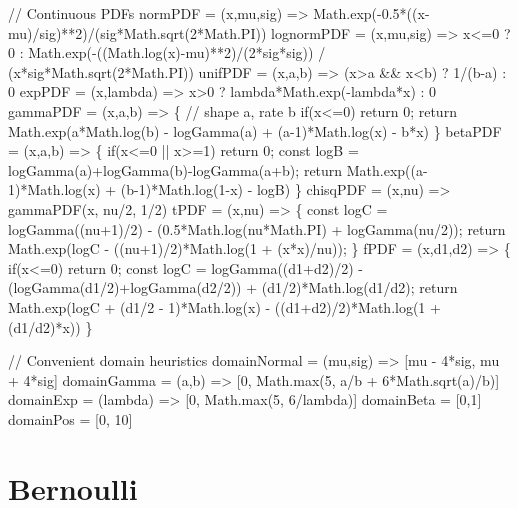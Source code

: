 \documentclass[
  letterpaper,
  DIV=11,
  numbers=noendperiod]{scrreprt}
\newenvironment{Shaded}{\begin{snugshade}}{\end{snugshade}}
\newcommand{\NormalTok}[1]{\textcolor[rgb]{0.00,0.23,0.31}{#1}}
\theoremstyle{definition}
\theoremstyle{plain}
\theoremstyle{definition}
\theoremstyle{remark}
\begin{document}
\begin{Shaded}
\begin{Highlighting}[]
\NormalTok{// Continuous PDFs}
\NormalTok{normPDF = (x,mu,sig) =\textgreater{} Math.exp({-}0.5*((x{-}mu)/sig)**2)/(sig*Math.sqrt(2*Math.PI))}
\NormalTok{lognormPDF = (x,mu,sig) =\textgreater{} x\textless{}=0 ? 0 : Math.exp({-}((Math.log(x){-}mu)**2)/(2*sig*sig)) / (x*sig*Math.sqrt(2*Math.PI))}
\NormalTok{unifPDF = (x,a,b) =\textgreater{} (x\textgreater{}a \&\& x\textless{}b) ? 1/(b{-}a) : 0}
\NormalTok{expPDF = (x,lambda) =\textgreater{} x\textgreater{}0 ? lambda*Math.exp({-}lambda*x) : 0}
\NormalTok{gammaPDF = (x,a,b) =\textgreater{} \{ // shape a, rate b}
\NormalTok{  if(x\textless{}=0) return 0;}
\NormalTok{  return Math.exp(a*Math.log(b) {-} logGamma(a) + (a{-}1)*Math.log(x) {-} b*x)}
\NormalTok{\}}
\NormalTok{betaPDF = (x,a,b) =\textgreater{} \{}
\NormalTok{  if(x\textless{}=0 || x\textgreater{}=1) return 0;}
\NormalTok{  const logB = logGamma(a)+logGamma(b){-}logGamma(a+b);}
\NormalTok{  return Math.exp((a{-}1)*Math.log(x) + (b{-}1)*Math.log(1{-}x) {-} logB)}
\NormalTok{\}}
\NormalTok{chisqPDF = (x,nu) =\textgreater{} gammaPDF(x, nu/2, 1/2)}
\NormalTok{tPDF = (x,nu) =\textgreater{} \{}
\NormalTok{  const logC = logGamma((nu+1)/2) {-} (0.5*Math.log(nu*Math.PI) + logGamma(nu/2));}
\NormalTok{  return Math.exp(logC {-} ((nu+1)/2)*Math.log(1 + (x*x)/nu));}
\NormalTok{\}}
\NormalTok{fPDF = (x,d1,d2) =\textgreater{} \{}
\NormalTok{  if(x\textless{}=0) return 0;}
\NormalTok{  const logC = logGamma((d1+d2)/2) {-} (logGamma(d1/2)+logGamma(d2/2)) + (d1/2)*Math.log(d1/d2);}
\NormalTok{  return Math.exp(logC + (d1/2 {-} 1)*Math.log(x) {-} ((d1+d2)/2)*Math.log(1 + (d1/d2)*x))}
\NormalTok{\}}

\NormalTok{// Convenient domain heuristics}
\NormalTok{domainNormal = (mu,sig) =\textgreater{} [mu {-} 4*sig, mu + 4*sig]}
\NormalTok{domainGamma  = (a,b) =\textgreater{} [0, Math.max(5, a/b + 6*Math.sqrt(a)/b)]}
\NormalTok{domainExp    = (lambda) =\textgreater{} [0, Math.max(5, 6/lambda)]}
\NormalTok{domainBeta   = [0,1]}
\NormalTok{domainPos    = [0, 10]}
\end{Highlighting}
\end{Shaded}

\section{Bernoulli}
\end{document}
